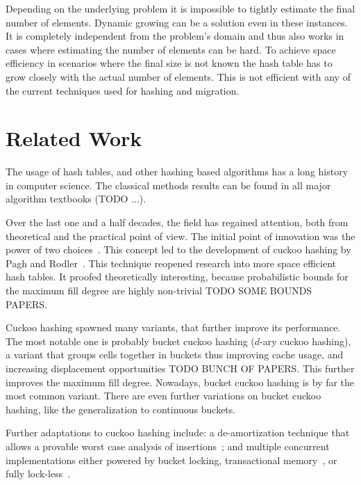 \documentclass[a4paper,UKenglish]{lipics-v2016}
\begin{document}
Depending on the underlying problem it is impossible to tightly
estimate the final number of elements.  Dynamic growing can be a
solution even in these instances.  It is completely independent from
the problem's domain and thus also works in cases where estimating the
number of elements can be hard.  To achieve space efficiency in
scenarios where the final size is not known the hash table has to grow
closely with the actual number of elements.  This is not efficient
with any of the current techniques used for hashing and migration.

\section{Related Work}
The usage of hash tables, and other hashing based algorithms has a
long history in computer science.  The classical methods results can
be found in all major algorithm textbooks (TODO ...).

Over the last one and a half decades, the field has regained
attention, both from theoretical and the practical point of view.  The
initial point of innovation was the power of two
choices~\cite{ThePowerOfTwoChoicesInRandomizedLoadBalancing}.
This concept led to the development of cuckoo hashing by Pagh and
Rodler~\cite{CuckooHashing}.  This technique reopened research into
more space efficient hash tables.  It proofed theoretically
interesting, because probabilistic bounds for the maximum fill degree
are highly non-trivial TODO SOME BOUNDS PAPERS.

Cuckoo hashing spawned many variants, that further improve its
performance.  The most notable one is probably bucket cuckoo hashing
($d$-ary cuckoo hashing), a variant that groups cells together in
buckets thus improving cache usage, and increasing displacement
opportunities TODO BUNCH OF PAPERS.  This further improves the maximum
fill degree. Nowadays, bucket cuckoo hashing is by far the most common
variant. There are even further variations on bucket cuckoo hashing,
like the generalization to continuous buckets.

Further adaptations to cuckoo hashing include: a de-amortization
technique that allows a provable worst case analysis of
insertions~\cite{UsingAQueueToDeAmortizeCuckooHashingInHardware,
  DeAmortizedCuckooHashingProvableWorstCasePerformanceAndExperimentalResults};
and multiple concurrent implementations either powered by bucket
locking, transactional
memory~\cite{AlgorithmicImprovementsForFastConcurrentCuckooHashing},
or fully lock-less~\cite{LockFreeCuckooHashing}.
\end{document}
